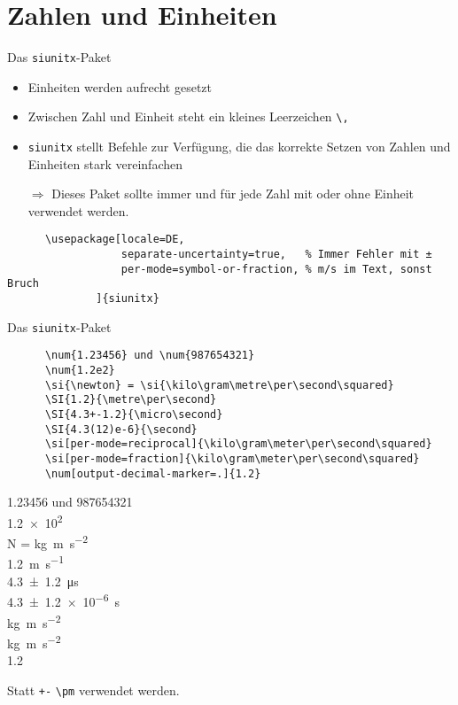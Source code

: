 \section{Zahlen und Einheiten}

\begin{frame}[fragile]{
  Das \texttt{siunitx}-Paket
  \hfill{}
}
\begin{itemize}
    \item Einheiten werden aufrecht gesetzt
    \item Zwischen Zahl und Einheit steht ein kleines Leerzeichen \verb+\,+
    \item \texttt{siunitx} stellt Befehle zur Verfügung, die das korrekte Setzen von Zahlen und Einheiten stark vereinfachen
    \item[$\Rightarrow$] Dieses Paket sollte immer und für jede Zahl mit oder ohne Einheit verwendet werden.
\end{itemize}
  \begin{Packages}
    \begin{lstlisting}
      \usepackage[locale=DE,
                  separate-uncertainty=true,   % Immer Fehler mit ±
                  per-mode=symbol-or-fraction, % m/s im Text, sonst Bruch
              ]{siunitx}
    \end{lstlisting}
  \end{Packages}
\end{frame}

\begin{frame}[fragile]{Das \texttt{siunitx}-Paket}
  \begin{CodeExample}{0.60}
    \begin{lstlisting}
      \num{1.23456} und \num{987654321}
      \num{1.2e2}
      \si{\newton} = \si{\kilo\gram\metre\per\second\squared}
      \SI{1.2}{\metre\per\second}
      \SI{4.3+-1.2}{\micro\second}
      \SI{4.3(12)e-6}{\second}
      \si[per-mode=reciprocal]{\kilo\gram\meter\per\second\squared}
      \si[per-mode=fraction]{\kilo\gram\meter\per\second\squared}
      \num[output-decimal-marker=.]{1.2}
    \end{lstlisting}
  \CodeResult
    \num{1.23456} und \num{987654321} \\
    \num{1.2e2} \\
    \smallbreak
    \si{\newton} = \si{\kilo\gram\metre\per\second\squared} \\
    \medbreak
    \SI{1.2}{\metre\per\second} \\
    \SI{4.3(12)}{\micro\second} \\
    \SI{4.3(12)e-6}{\second} \\
    \si[per-mode=reciprocal]{\kilo\gram\meter\per\second\squared} \\[\baselineskip]
    \si[per-mode=fraction]{\kilo\gram\meter\per\second\squared} \\[\baselineskip]
    \num[output-decimal-marker=.]{1.2}
  \end{CodeExample}
  Statt \lstinline_+-_ \lstinline+\pm+ verwendet werden.
\end{frame}
